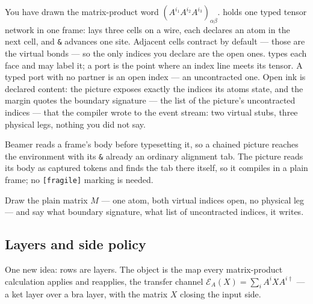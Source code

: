 You have drawn the matrix-product word $(A^{i_1}A^{i_2}A^{i_3})_{\alpha\beta}$.
 holds one typed
tensor network in one frame:  lays three cells on a wire,
each  declares an atom in the next cell, and \verb|&| advances
one site.  Adjacent cells contract by default --- those are the virtual
bonds --- so the only indices you declare are the open ones.
 types each face and may label it; a port is the point
where an index line meets its tensor.  A typed port with no partner is
an open index --- an uncontracted one.  Open ink is declared content:
the picture exposes exactly the indices its atoms state, and the margin
quotes the boundary signature --- the list of the picture's uncontracted
indices --- that the compiler wrote to the  event stream:
two virtual stubs, three physical legs, nothing you did not say.

\dbendpar Beamer reads a frame's body before typesetting it, so a chained
picture reaches the environment with its \verb|&| already an ordinary
alignment tab.  The picture reads its body as captured tokens and finds
the tab there itself, so it compiles in a plain frame; no
\texttt{[fragile]} marking is needed.

 Draw the plain matrix $M$ --- one atom, both
virtual indices open, no physical leg --- and say what boundary
signature, what list of uncontracted indices, it writes.

\subsection{Layers and side policy}

One new idea: rows are layers.  The object is the map every
matrix-product calculation applies and reapplies, the transfer channel
$\mathcal E_A(X)=\sum_i A^iXA^{i\dagger}$ --- a ket layer over a bra
layer, with the matrix $X$ closing the input side.

\begin{tnexample}[
  formula={\mathcal E_A(X)=\sum_i A^i X A^{i\dagger}},
  caption={the channel applied to $X$},
  index={$X$ closes the east input pair.  The west pair remains open because
    the output is a matrix; the vertical connection sums the physical
    index $i$.},
  signature={kernel-boundary|signature=open:w, open:w}]
\begin{tenkz}[rows={ket,bra}, cols=1, west=open, east={cup=$X$}]
   \\
\end{tenkz}
\end{tnexample}

